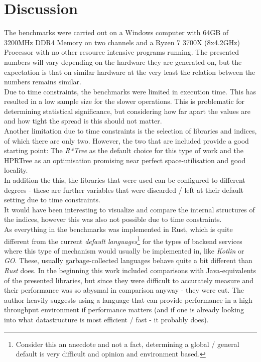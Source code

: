 \chapter{Discussion}
\label{chap:disc}

The benchmarks were carried out on a Windows computer with 64GB of 3200MHz DDR4 Memory on two channels and a Ryzen 7 3700X (8x4.2GHz) Processor with no other resource intensive programs running. The presented numbers will vary depending on the hardware they are generated on, but the expectation is that on similar hardware at the very least the relation between the numbers remains similar.\\

Due to time constraints, the benchmarks were limited in execution time. This has resulted in a low sample size for the slower operations. This is problematic for determining statistical significance, but considering how far apart the values are and how tight the spread is this should not matter.\\

Another limitation due to time constraints is the selection of libraries and indices, of which there are only two. However, the two that are included provide a good starting point: The \textit{R*Tree} as the default choice for this type of work and the \acs{HPRTree} as an optimisation promising near perfect space-utilisation and good locality.\\

In addition the this, the libraries that were used can be configured to different degrees - these are further variables that were discarded / left at their default setting due to time constraints.\\

It would have been interesting to visualize and compare the internal structures of the indices, however this was also not possible due to time constraints.\\

As everything in the benchmarks was implemented in Rust, which is quite different from the current \textit{default languages}\footnote{Consider this an anecdote and not a fact, determining a global / general default is very difficult and opinion and environment based.} for the types of backend services where this type of mechanism would usually be implemented in, like \textit{Kotlin} or \textit{GO}. These, usually garbage-collected languages behave quite a bit different than \textit{Rust} does. In the beginning this work included comparisons with Java-equivalents of the presented libraries, but since they were difficult to accurately measure and their performance was so abysmal in comparison anyway - they were cut. The author heavily suggests using a language that can provide performance in a high throughput environment if performance matters (and if one is already looking into what datastructure is most efficient / fast - it probably does).\\

